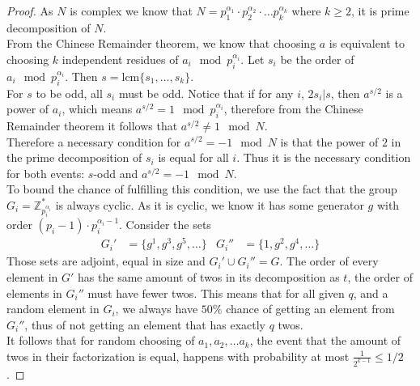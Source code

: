 \begin{proof}
     As $N$ is complex we know that $N=p_1^{\alpha_1} \cdot p_2^{\alpha_2} \cdot \dots p_k^{\alpha_k}$
     where $k\geq 2$, it is prime decomposition of $N$.\\
     From the Chinese Remainder theorem, we know that choosing $a$ is equivalent to choosing $k$ independent residues of $a_i \mod p_i^{\alpha_i}$. Let $s_i$ be the order of $a_i \mod{p_i^{\alpha_i}}$. Then $s=\text{lcm}\{s_1,\dots, s_k\}$. \\
     For $s$ to be odd, all $s_i$ must be odd. Notice that if for any $i$, $2s_i|s$, then $a^{s/2}$ is a power of $a_i$, which means $a^{s/2}=1 \mod{p_i^{\alpha_i}}$, therefore from the Chinese Remainder theorem it follows that $a^{s/2} \neq 1 \mod{N}$.
     \\Therefore a necessary condition for $a^{s/2}=-1 \mod{N}$ is that the power of $2$ in the prime decomposition of $s_i$ is equal for all $i$. Thus it is the necessary condition for both events: $s$-odd and $a^{s/2}=-1 \mod{N}$. \\
     To bound the chance of fulfilling this condition, we use the fact that the group $G_i=\mathbb{Z}^*_{p_i^{\alpha_i}}$ is always cyclic. As it is cyclic, we know it has some generator $g$ with order $(p_i-1)\cdot p_i^{\alpha_i-1}$. Consider the sets 
     \begin{align*}
         G_i'&=\{g^1, g^3, g^5, \dots\} & G_i''&=\{1,g^2, g^4, \dots\} 
     \end{align*}
     Those sets are adjoint, equal in size and $G_i' \cup G_i''=G$. The order of every element in $G'$ has the same amount of twos in its decomposition as $t$, the order of elements in $G_i''$ must have fewer twos. This means that for all given $q$, and a random element in $G_i$, we always have $50\%$ chance of getting an element from $G_i''$, thus of not getting an element that has exactly $q$ twos. 
     \\
     It follows that for random choosing of $a_1, a_2, \dots a_k$, the event that the amount of twos in their factorization is equal, happens with probability at most $\frac{1}{2^{k-1}}\leq 1/2$.
 \end{proof}






